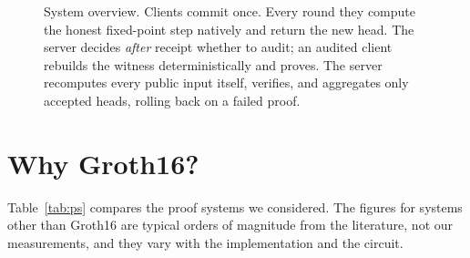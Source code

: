 \documentclass[conference]{IEEEtran}
\begin{document}
\begin{figure}[t]
{}
\caption{System overview. Clients commit once. Every round they compute the honest fixed-point
step natively and return the new head. The server decides \emph{after} receipt whether to audit;
an audited client rebuilds the witness deterministically and proves. The server recomputes every
public input itself, verifies, and aggregates only accepted heads, rolling back on a failed proof.}
\label{fig:arch}
\end{figure}

\section{Why Groth16?}\label{sec:why}
Table~\ref{tab:ps} compares the proof systems we considered. The figures for systems other than
Groth16 are typical orders of magnitude from the literature, not our measurements, and they vary
with the implementation and the circuit.

\begin{table}[t]
\centering\footnotesize\caption{Proof-system comparison (typical orders of magnitude; Groth16 measured).}\label{tab:ps}
\setlength{\tabcolsep}{2.4pt}
\end{table}
\end{document}
